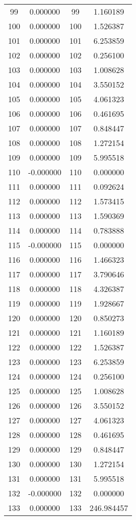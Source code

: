 \documentclass[12pt]{article}
\begin{document}
\begin{longtable}{@{}cccc@{}}
99 & 0.000000 & 99 & 1.160189 \\
100 & 0.000000 & 100 & 1.526387 \\
101 & 0.000000 & 101 & 6.253859 \\
102 & 0.000000 & 102 & 0.256100 \\
103 & 0.000000 & 103 & 1.008628 \\
104 & 0.000000 & 104 & 3.550152 \\
105 & 0.000000 & 105 & 4.061323 \\
106 & 0.000000 & 106 & 0.461695 \\
107 & 0.000000 & 107 & 0.848447 \\
108 & 0.000000 & 108 & 1.272154 \\
109 & 0.000000 & 109 & 5.995518 \\
110 & -0.000000 & 110 & 0.000000 \\
111 & 0.000000 & 111 & 0.092624 \\
112 & 0.000000 & 112 & 1.573415 \\
113 & 0.000000 & 113 & 1.590369 \\
114 & 0.000000 & 114 & 0.783888 \\
115 & -0.000000 & 115 & 0.000000 \\
116 & 0.000000 & 116 & 1.466323 \\
117 & 0.000000 & 117 & 3.790646 \\
118 & 0.000000 & 118 & 4.326387 \\
119 & 0.000000 & 119 & 1.928667 \\
120 & 0.000000 & 120 & 0.850273 \\
121 & 0.000000 & 121 & 1.160189 \\
122 & 0.000000 & 122 & 1.526387 \\
123 & 0.000000 & 123 & 6.253859 \\
124 & 0.000000 & 124 & 0.256100 \\
125 & 0.000000 & 125 & 1.008628 \\
126 & 0.000000 & 126 & 3.550152 \\
127 & 0.000000 & 127 & 4.061323 \\
128 & 0.000000 & 128 & 0.461695 \\
129 & 0.000000 & 129 & 0.848447 \\
130 & 0.000000 & 130 & 1.272154 \\
131 & 0.000000 & 131 & 5.995518 \\
132 & -0.000000 & 132 & 0.000000 \\
133 & 0.000000 & 133 & 246.984457 \\

\end{longtable}
\end{document}
